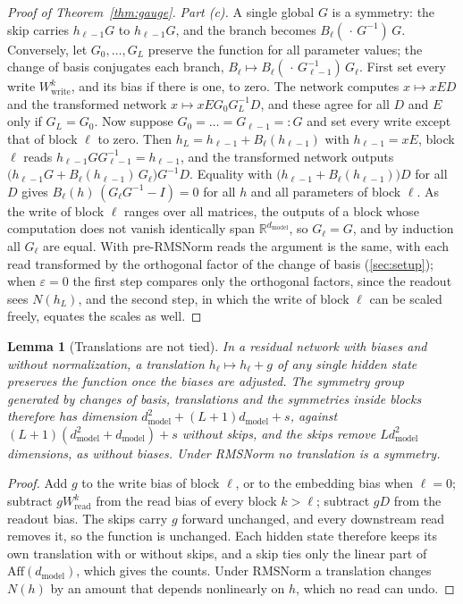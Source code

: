 \documentclass[10pt]{article}
\newtheorem{lemma}[theorem]{Lemma}
\theoremstyle{definition}
\theoremstyle{remark}
\newcommand{\R}{\mathbb{R}}
\newcommand{\Wread}{W_{\mathrm{read}}}
\newcommand{\Wwrite}{W_{\mathrm{write}}}
\newcommand{\dm}{d_{\mathrm{model}}}
\newcommand{\Aff}{\mathrm{Aff}}
\begin{document}
\begin{proof}[Proof of Theorem~\ref{thm:gauge}]
\emph{Part (c).} A single global $G$ is a symmetry: the skip carries $h_{\ell-1}G$ to $h_{\ell-1}G$, and the branch becomes $B_\ell(\,\cdot\,G^{-1})\,G$. Conversely, let $G_0, \dots, G_L$ preserve the function for all parameter values; the change of basis conjugates each branch, $B_\ell \mapsto B_\ell(\,\cdot\,G_{\ell-1}^{-1})\,G_\ell$. First set every write $\Wwrite^{k}$, and its bias if there is one, to zero. The network computes $x \mapsto xED$ and the transformed network $x \mapsto xEG_0G_L^{-1}D$, and these agree for all $D$ and $E$ only if $G_L = G_0$. Now suppose $G_0 = \dots = G_{\ell-1} =: G$ and set every write except that of block $\ell$ to zero. Then $h_L = h_{\ell-1} + B_\ell(h_{\ell-1})$ with $h_{\ell-1} = xE$, block $\ell$ reads $h_{\ell-1}GG_{\ell-1}^{-1} = h_{\ell-1}$, and the transformed network outputs $\big(h_{\ell-1}G + B_\ell(h_{\ell-1})\,G_\ell\big)G^{-1}D$. Equality with $\big(h_{\ell-1} + B_\ell(h_{\ell-1})\big)D$ for all $D$ gives $B_\ell(h)\,(G_\ell G^{-1} - I) = 0$ for all $h$ and all parameters of block $\ell$. As the write of block $\ell$ ranges over all matrices, the outputs of a block whose computation does not vanish identically span $\R^{\dm}$, so $G_\ell = G$, and by induction all $G_\ell$ are equal. With pre-RMSNorm reads the argument is the same, with each read transformed by the orthogonal factor of the change of basis (\cref{sec:setup}); when $\varepsilon = 0$ the first step compares only the orthogonal factors, since the readout sees $N(h_L)$, and the second step, in which the write of block $\ell$ can be scaled freely, equates the scales as well.
\end{proof}

\begin{lemma}[Translations are not tied]\label{lem:translations}
In a residual network with biases and without normalization, a translation $h_\ell \mapsto h_\ell + g$ of any single hidden state preserves the function once the biases are adjusted. The symmetry group generated by changes of basis, translations and the symmetries inside blocks therefore has dimension $\dm^2 + (L+1)\dm + s$, against $(L+1)(\dm^2 + \dm) + s$ without skips, and the skips remove $L\dm^2$ dimensions, as without biases. Under RMSNorm no translation is a symmetry.
\end{lemma}

\begin{proof}
Add $g$ to the write bias of block $\ell$, or to the embedding bias when $\ell = 0$; subtract $g\Wread^{k}$ from the read bias of every block $k > \ell$; subtract $gD$ from the readout bias. The skips carry $g$ forward unchanged, and every downstream read removes it, so the function is unchanged. Each hidden state therefore keeps its own translation with or without skips, and a skip ties only the linear part of $\Aff(\dm)$, which gives the counts. Under RMSNorm a translation changes $N(h)$ by an amount that depends nonlinearly on $h$, which no read can undo.
\end{proof}
\end{document}
